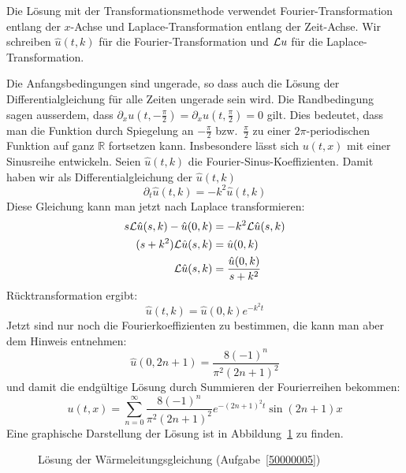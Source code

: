 \begin{loesung}
Die Lösung mit der Transformationsmethode
verwendet Fourier-Transformation
entlang der $x$-Achse und Laplace-Transformation entlang der Zeit-Achse.
Wir schreiben $\hat u(t,k)$ für die Fourier-Transformation und ${\cal L} u$
für die Laplace-Transformation.

Die Anfangsbedingungen sind ungerade, so dass auch die Lösung der
Differentialgleichung für alle Zeiten ungerade sein wird. Die
Randbedingung sagen ausserdem, dass
$\partial_xu(t,-\frac{\pi}2)=\partial_xu(t,\frac{\pi}2)=0$ gilt.
Dies bedeutet, dass man die Funktion durch Spiegelung an
$-\frac{\pi}2$ bzw.~$\frac{\pi}2$ zu einer $2\pi$-periodischen
Funktion auf ganz $\mathbb R$ fortsetzen kann. Insbesondere lässt
sich $u(t,x)$ mit einer Sinusreihe entwickeln. Seien $\hat u(t,k)$
die Fourier-Sinus-Koeffizienten. Damit haben wir als Differentialgleichung
der $\hat u(t,k)$
\[
\partial_t\hat u(t,k)=-k^2\hat u(t,k)
\]
Diese Gleichung kann man jetzt nach Laplace transformieren:
\begin{align*}
s{\cal L}\hat u(s,k) - \hat u(0,k)&=-k^2 {\cal L}\hat u(s,k)\\
(s+k^2){\cal L}\hat u(s,k)&=\hat u(0,k)\\
{\cal L}\hat u(s,k)&=\frac{\hat u(0,k)}{s+k^2}
\end{align*}
Rücktransformation ergibt:
\[
\hat u(t,k)=\hat u(0,k) e^{-k^2t}
\]
Jetzt sind nur noch die Fourierkoeffizienten zu bestimmen, die kann
man aber dem Hinweis entnehmen:
\[
\hat u(0,2n+1)=
\frac{8(-1)^n}{\pi^2(2n+1)^2}
\]
und damit die endgültige Lösung durch Summieren der Fourierreihen bekommen:
\[
u(t,x)=
\sum_{n=0}^\infty \frac{8(-1)^n}{\pi^2(2n+1)^2}e^{-(2n+1)^2t}\sin(2n+1)x
\]
Eine graphische Darstellung der Lösung ist in Abbildung~\ref{50000005:bild}
zu finden.
\begin{figure}
\begin{center}
\end{center}
\caption{Lösung der Wärmeleitungsgleichung (Aufgabe~\ref{50000005})
\label{50000005:bild}}
\end{figure}
\end{loesung}
